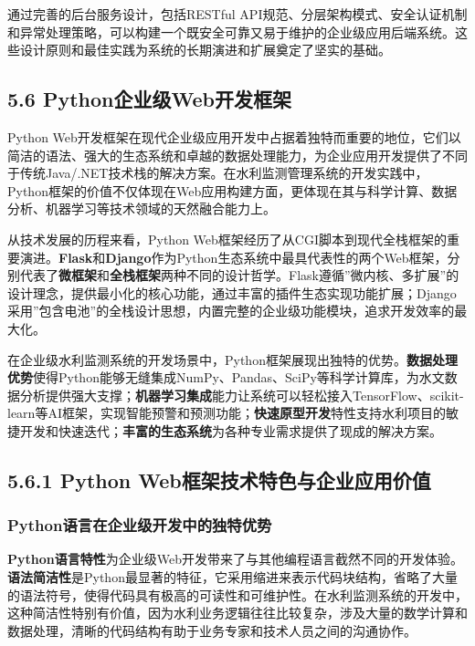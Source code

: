 通过完善的后台服务设计，包括RESTful API规范、分层架构模式、安全认证机制和异常处理策略，可以构建一个既安全可靠又易于维护的企业级应用后端系统。这些设计原则和最佳实践为系统的长期演进和扩展奠定了坚实的基础。

\subsection{5.6 Python企业级Web开发框架}\label{pythonux4f01ux4e1aux7ea7webux5f00ux53d1ux6846ux67b6}

Python Web开发框架在现代企业级应用开发中占据着独特而重要的地位，它们以简洁的语法、强大的生态系统和卓越的数据处理能力，为企业应用开发提供了不同于传统Java/.NET技术栈的解决方案。在水利监测管理系统的开发实践中，Python框架的价值不仅体现在Web应用构建方面，更体现在其与科学计算、数据分析、机器学习等技术领域的天然融合能力上。

从技术发展的历程来看，Python Web框架经历了从CGI脚本到现代全栈框架的重要演进。\textbf{Flask}和\textbf{Django}作为Python生态系统中最具代表性的两个Web框架，分别代表了\textbf{微框架}和\textbf{全栈框架}两种不同的设计哲学。Flask遵循''微内核、多扩展''的设计理念，提供最小化的核心功能，通过丰富的插件生态实现功能扩展；Django采用''包含电池''的全栈设计思想，内置完整的企业级功能模块，追求开发效率的最大化。

在企业级水利监测系统的开发场景中，Python框架展现出独特的优势。\textbf{数据处理优势}使得Python能够无缝集成NumPy、Pandas、SciPy等科学计算库，为水文数据分析提供强大支撑；\textbf{机器学习集成}能力让系统可以轻松接入TensorFlow、scikit-learn等AI框架，实现智能预警和预测功能；\textbf{快速原型开发}特性支持水利项目的敏捷开发和快速迭代；\textbf{丰富的生态系统}为各种专业需求提供了现成的解决方案。

\subsection{5.6.1 Python Web框架技术特色与企业应用价值}\label{python-webux6846ux67b6ux6280ux672fux7279ux8272ux4e0eux4f01ux4e1aux5e94ux7528ux4ef7ux503c}

\subsubsection{Python语言在企业级开发中的独特优势}\label{pythonux8bedux8a00ux5728ux4f01ux4e1aux7ea7ux5f00ux53d1ux4e2dux7684ux72ecux7279ux4f18ux52bf}

\textbf{Python语言特性}为企业级Web开发带来了与其他编程语言截然不同的开发体验。\textbf{语法简洁性}是Python最显著的特征，它采用缩进来表示代码块结构，省略了大量的语法符号，使得代码具有极高的可读性和可维护性。在水利监测系统的开发中，这种简洁性特别有价值，因为水利业务逻辑往往比较复杂，涉及大量的数学计算和数据处理，清晰的代码结构有助于业务专家和技术人员之间的沟通协作。


